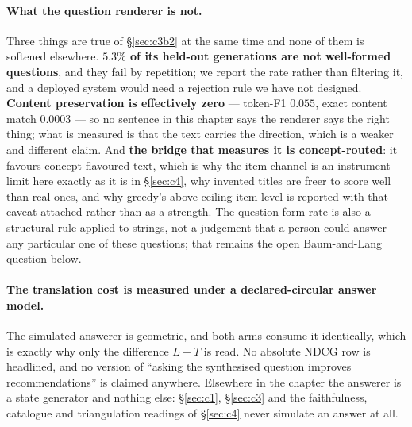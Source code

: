 \documentclass[11pt]{article}
\begin{document}
\paragraph{What the question renderer is not.} Three things are true of \S\ref{sec:c3b2} at the same
time and none of them is softened elsewhere. \textbf{$5.3\%$ of its held-out generations are not
well-formed questions}, and they fail by repetition; we report the rate rather than filtering it, and
a deployed system would need a rejection rule we have not designed. \textbf{Content preservation is
effectively zero} --- token-F1 $0.055$, exact content match $0.0003$ --- so no sentence in this
chapter says the renderer says the right thing; what is measured is that the text carries the
direction, which is a weaker and different claim. And \textbf{the bridge that measures it is
concept-routed}: it favours concept-flavoured text, which is why the item channel is an instrument
limit here exactly as it is in \S\ref{sec:c4}, why invented titles are freer to score well than real
ones, and why greedy's above-ceiling item level is reported with that caveat attached rather than as
a strength. The question-form rate is also a structural rule applied to strings, not a judgement that
a person could answer any particular one of these questions; that remains the open Baum-and-Lang
question below.

\paragraph{The translation cost is measured under a declared-circular answer model.} The simulated
answerer is geometric, and both arms consume it identically, which is exactly why only the difference
$L-T$ is read. No absolute NDCG row is headlined, and no version of ``asking the synthesised question
improves recommendations'' is claimed anywhere. Elsewhere in the chapter the answerer is a state
generator and nothing else: \S\ref{sec:c1}, \S\ref{sec:c3} and the faithfulness, catalogue and
triangulation readings of \S\ref{sec:c4} never simulate an answer at all.
\end{document}
